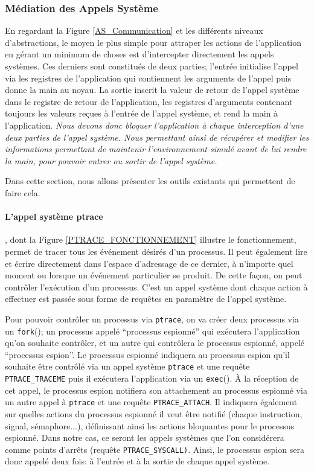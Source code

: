 \subsubsection{Médiation des Appels Système}

En regardant la Figure \ref{AS_Communication} et les différents niveaux
d'abstractions, le moyen le plus simple pour attraper les actions de
l'application en gérant un minimum de choses est d'intercepter directement les
appels systèmes.  Ces derniers sont constitués de deux parties; l'entrée
initialise l'appel via les registres de l'application qui contiennent les
arguments de l'appel puis donne la main au noyau. La sortie inscrit la valeur de
retour de l'appel système dans le registre de retour de l'application, les
registres d'arguments contenant toujours les valeurs reçues à l'entrée de
l'appel système, et rend la main à l'application. \textit{Nous devons donc
bloquer l'application à chaque interception d'une deux parties de l'appel
système. Nous permettant ainsi de récupérer et modifier les informations
permettant de maintenir l'environnement simulé avant de lui rendre la main, pour
pouvoir entrer ou sortir de l'appel système.}

 Dans cette section, nous allons présenter les outils existants qui permettent
 de faire cela.
 
 \paragraph{L'appel système ptrace}\citep{AS:Interception, MARION:Interception}
 , dont la Figure \ref{PTRACE_FONCTIONNEMENT} illustre le fonctionnement, permet
 de tracer tous les événement désirés d'un processus. Il peut également lire et
 écrire directement dans l'espace d'adressage de ce dernier, à n'importe quel
 moment ou lorsque un événement particulier se produit. De cette façon, on peut
 contrôler l'exécution d'un processus. C'est un appel système dont chaque action
 à effectuer est passée sous forme de requêtes en paramètre de l'appel système.

Pour pouvoir contrôler un processus via \texttt{ptrace}, on va créer deux
processus via un \texttt{fork}(); un processus appelé ``processus espionné'' qui
exécutera l'application qu'on souhaite contrôler, et un autre qui contrôlera le
processus espionné, appelé ``processus espion''. Le processus espionné indiquera
au processus espion qu'il souhaite être contrôlé via un appel
système \texttt{ptrace} et une requête \texttt{PTRACE\_TRACEME} puis il
exécutera l'application via un \texttt{exec}(). À la réception de cet appel, le
processus espion notifiera son attachement au processus espionné via un autre
appel à \texttt{ptrace} et une requête \texttt{PTRACE\_ATTACH}. Il indiquera
également sur quelles actions du processus espionné il veut être notifié (chaque
instruction, signal, sémaphore...), définissant ainsi les actions bloquantes
pour le processus espionné. Dans notre cas, ce seront les appels systèmes que
l'on considérera comme points d'arrêts (requête
\texttt{PTRACE\_SYSCALL)}. Ainsi, le processus espion sera donc appelé deux
fois: à l'entrée et à la sortie de chaque appel système.

